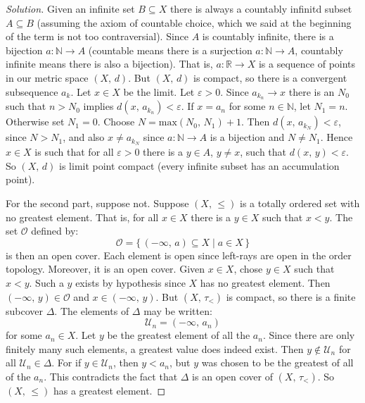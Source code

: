 \documentclass{article}
\theoremstyle{normal}
\begin{document}
    \begin{proof}[Solution]
        Given an infinite set $B\subseteq{X}$ there is always a countably
        infinitd subset $A\subseteq{B}$ (assuming the axiom of countable choice,
        which we said at the beginning of the term is not too contraversial).
        Since $A$ is countably infinite, there is a bijection
        $a:\mathbb{N}\rightarrow{A}$ (countable means there is a surjection
        $a:\mathbb{N}\rightarrow{A}$, countably infinite means there is also a
        bijection). That is, $a:\mathbb{R}\rightarrow{X}$ is a sequence of
        points in our metric space $(X,\,d)$. But $(X,\,d)$ is compact, so
        there is a convergent subsequence $a_{k}$. Let $x\in{X}$ be the
        limit. Let $\varepsilon>0$. Since $a_{k_{n}}\rightarrow{x}$ there is
        an $N_{0}$ such that $n>N_{0}$ implies $d(x,\,a_{k_{n}})<\varepsilon$.
        If $x=a_{n}$ for some $n\in\mathbb{N}$, let $N_{1}=n$. Otherwise set
        $N_{1}=0$. Choose $N=\textrm{max}(N_{0},\,N_{1})+1$. Then
        $d(x,\,a_{k_{N}})<\varepsilon$, since $N>N_{1}$, and also
        $x\ne{a}_{k_{N}}$ since $a:\mathbb{N}\rightarrow{A}$ is a bijection and
        $N\ne{N}_{1}$. Hence $x\in{X}$ is such that for all $\varepsilon>0$
        there is a $y\in{A}$, $y\ne{x}$, such that $d(x,\,y)<\varepsilon$. So
        $(X,\,d)$ is limit point compact (every infinite subset has an
        accumulation point).
        \par\hfill\par
        For the second part, suppose not. Suppose $(X,\,\leq)$ is a totally
        ordered set with no greatest element. That is, for all
        $x\in{X}$ there is a $y\in{X}$ such that $x<y$. The set
        $\mathcal{O}$ defined by:
        \begin{equation}
            \mathcal{O}=\{\,(-\infty,\,a)\subseteq{X}\;|\;a\in{X}\,\}
        \end{equation}
        is then an open cover. Each element is open since left-rays are open
        in the order topology. Moreover, it is an open cover. Given
        $x\in{X}$, chose $y\in{X}$ such that $x<y$. Such a $y$ exists by
        hypothesis since $X$ has no greatest element. Then
        $(-\infty,\,y)\in\mathcal{O}$ and $x\in(-\infty,\,y)$. But
        $(X,\,\tau_{<})$ is compact, so there is a finite subcover
        $\Delta$. The elements of $\Delta$ may be written:
        \begin{equation}
            \mathcal{U}_{n}=(-\infty,\,a_{n})
        \end{equation}
        for some $a_{n}\in{X}$. Let $y$ be the greatest element of all the
        $a_{n}$. Since there are only finitely many such elements, a greatest
        value does indeed exist. Then $y\notin\mathcal{U}_{n}$ for all
        $\mathcal{U}_{n}\in\Delta$. For if $y\in\mathcal{U}_{n}$, then
        $y<a_{n}$, but $y$ was chosen to be the greatest of all of the $a_{n}$.
        This contradicts the fact that $\Delta$ is an open cover of
        $(X,\,\tau_{<})$. So $(X,\,\leq)$ has a greatest element.
    \end{proof}
\end{document}
